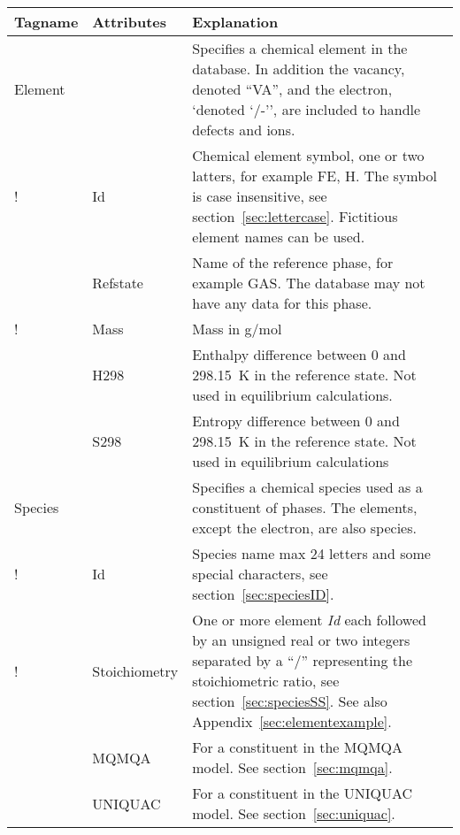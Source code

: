 \documentclass{article}
\begin{document}
\begin{tabular}{|p{} p{} p{}|}\hline
  Tagname & Attributes & Explanation\\\hline

  Element & & Specifies a chemical element in the database.  In addition
              the vacancy, denoted ``VA'', and the electron, `denoted `/-'',
              are included to handle defects and ions.\\
!          & Id        &  Chemical element symbol, one or two latters, 
                         for example FE, H.  The symbol is case insensitive,
                         see section~\ref{sec:lettercase}.
                         Fictitious element names can be used. \\
          & Refstate  &  Name of the reference  phase, for example GAS.  The
                         database may not have any data for this phase. \\
!          & Mass      &  Mass in g/mol\\
          & H298      &  Enthalpy difference between 0 and 298.15~K 
                         in the reference state.  Not used in equilibrium
                         calculations. \\
          & S298      &  Entropy difference between 0 and 298.15~K in 
                         the reference state.  Not used in equilibrium
                         calculations\\\hline

  Species & & Specifies a chemical species used as a constituent of phases.  
                        The elements, except the electron, are also species.\\
!          & Id        & Species name max 24 letters and some special
                         characters, see section~\ref{sec:speciesID}.\\
!          & Stoichiometry & One or more element {\em Id} each followed by 
                        an unsigned real or two integers separated by a ``/'' 
                        representing the stoichiometric ratio,
                        see section~\ref{sec:speciesSS}.  See also
                        Appendix~\ref{sec:elementexample}.\\
          & MQMQA     & For a constituent in the MQMQA model.  See 
                        section~\ref{sec:mqmqa}.\\
          & UNIQUAC   & For a constituent in the UNIQUAC model. See 
                        section~\ref{sec:uniquac}.\\\hline

\end{tabular}
\end{document}
